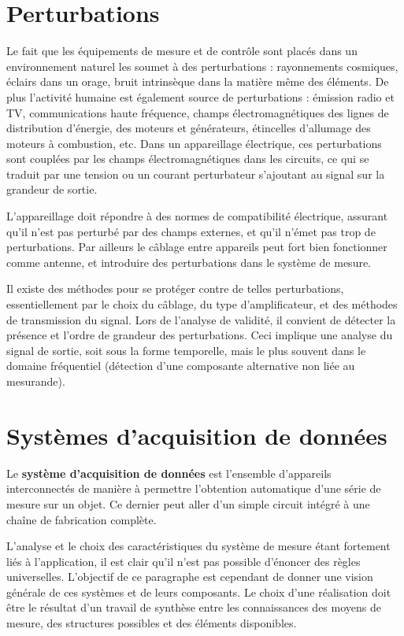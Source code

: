\documentclass[main.tex]{subfiles}
\begin{document}
\section{Perturbations}

Le fait que les équipements de mesure et de contrôle sont placés dans un environnement naturel les soumet à des perturbations : rayonnements cosmiques, éclairs dans un orage, bruit intrinsèque dans la matière même des éléments. De plus l'activité humaine est également source de perturbations : émission radio et TV, communications haute fréquence, champs électromagnétiques des lignes de distribution d'énergie, des moteurs et générateurs, étincelles d'allumage des moteurs à combustion, etc. Dans un appareillage électrique, ces perturbations sont couplées par les champs électromagnétiques dans les circuits, ce qui se traduit par une tension ou un courant perturbateur s'ajoutant au signal sur la grandeur de sortie.

L'appareillage doit répondre à des normes de compatibilité électrique, assurant qu'il n'est pas perturbé par des champs externes, et qu'il n'émet pas trop de perturbations. Par ailleurs le câblage entre appareils peut fort bien fonctionner comme antenne, et introduire des perturbations dans le système de mesure.

Il existe des méthodes pour se protéger contre de telles perturbations, essentiellement par le choix du câblage, du type d'amplificateur, et des méthodes de transmission du signal. Lors de l'analyse de validité, il convient de détecter la présence et l'ordre de grandeur des perturbations. Ceci implique une analyse du signal de sortie, soit sous la forme temporelle, mais le plus souvent dans le domaine fréquentiel (détection d'une composante alternative non liée au mesurande).

\section{Systèmes d'acquisition de données}

\begin{definition}
    Le \textbf{système d'acquisition de données} est l'ensemble d'appareils interconnectés de manière à permettre l'obtention automatique d'une série de mesure sur un objet. Ce dernier peut aller d'un simple circuit intégré à une chaîne de fabrication complète.
\end{definition}

L'analyse et le choix des caractéristiques du système de mesure étant fortement liés à l'application, il est clair qu'il n'est pas possible d'énoncer des règles universelles. L'objectif de ce paragraphe est cependant de donner une vision générale de ces systèmes et de leurs composants. Le choix d'une réalisation doit être le résultat d'un travail de synthèse entre les connaissances des moyens de mesure, des structures possibles et des éléments disponibles.
\end{document}
